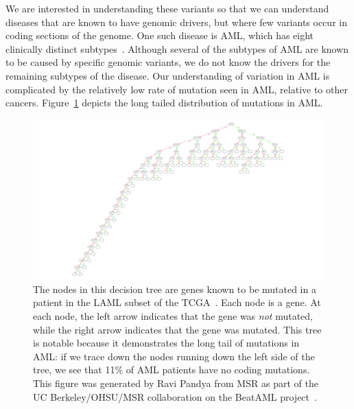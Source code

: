 \documentclass[11pt]{article} %
\begin{document}
We are interested in understanding these variants so that we can understand diseases that are
known to have genomic drivers, but where few variants occur in coding sections of the genome.
One such disease is AML, which has eight clinically distinct subtypes~\cite{cancer13}. Although
several of the
subtypes of AML are known to be caused by specific genomic variants, we do not know the drivers
for the remaining subtypes of the disease. Our understanding of variation in AML is complicated
by the relatively low rate of mutation seen in AML, relative to other cancers.
Figure~\ref{fig:aml} depicts the long tailed distribution of mutations in AML.

\begin{figure}[h]
\begin{center}
\includegraphics[width=\linewidth]{aml.pdf}
\caption{The nodes in this decision tree are genes known to be mutated in a patient in the LAML
subset of the TCGA~\cite{cancer13}. Each node is a gene. At each node, the left arrow indicates
that the gene was \emph{not} mutated, while the right arrow indicates that the gene was mutated.
This tree is notable because it demonstrates the long tail of mutations in AML: if we trace down
the nodes running down the left side of the tree, we see that 11\% of AML patients have no coding
mutations. This figure was generated by Ravi Pandya from MSR as part of the UC Berkeley/OHSU/MSR
collaboration on the BeatAML project~\cite{paten15}.}
\label{fig:aml}
\end{center}
\end{figure}
\end{document}
